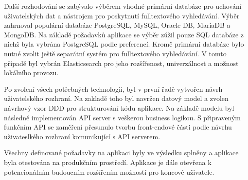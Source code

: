 Další rozhodování se zabývalo výběrem vhodné primární databáze pro uchování uživatelských dat a nástrojem pro
poskytnutí fulltextového vyhledávání.
Výběr zahrnoval populární databáze PostgreSQL, MySQL, Oracle DB, MariaDB a MongoDB.
Na základě požadavků aplikace se výběr zúžil pouze \ac{SQL} databáze z nichž byla vybrána PostgreSQL podle preferencí.
Kromě primární databáze bylo nutné zvolit ještě separátní systém pro fulltextového vyhledávání.
V tomto případě byl vybrán Elasticsearch pro jeho rozšířenost, univerzálnost a možnost lokálního provozu.

Po zvolení všech potřebných technologií, byl v první řadě vytvořen návrh uživatelského rozhraní.
Na zakladě toho byl navržen datový model a zvolen návrhový vzor \ac{DDD} pro strukturování
kódu aplikace.
Na základě modelu byl následně implementován \ac{API} server s veškerou business logikou.
S připraveným funkčním \ac{API} se zaměření přesunulo tvorbu front-endové části podle návrhu uživateslkého rozhraní
komunikující s \ac{API} serverem.

Všechny definované požadavky na aplikaci byly ve výsledku splněny a aplikace byla otestována na produkčním prostředí.
Aplikace je dále otevřena k potencionálním budoucním rozšířením možností pro koncové uživatele.

